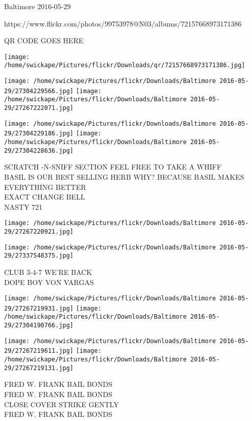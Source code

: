 \documentclass[10pt,letterpaper]{article}
\begin{document}
Baltimore 2016-05-29

https://www.flickr.com/photos/99753978@N03/albums/72157668973171386

QR CODE GOES HERE

\texttt{[image: /home/swickape/Pictures/flickr/Downloads/qr/72157668973171386.jpg]}
\pagebreak

\texttt{[image: /home/swickape/Pictures/flickr/Downloads/Baltimore 2016-05-29/27304229566.jpg]}
\texttt{[image: /home/swickape/Pictures/flickr/Downloads/Baltimore 2016-05-29/27267222071.jpg]}

\texttt{[image: /home/swickape/Pictures/flickr/Downloads/Baltimore 2016-05-29/27304229186.jpg]}
\texttt{[image: /home/swickape/Pictures/flickr/Downloads/Baltimore 2016-05-29/27304228636.jpg]}

SCRATCH {-}N{-}SNIFF SECTION FEEL FREE TO TAKE A WHIFF\\
BASIL IS OUR BEST SELLING HERB WHY?  BECAUSE BASIL MAKES EVERYTHING BETTER\\
EXACT CHANGE BELL\\
NASTY 721\\
\pagebreak

\texttt{[image: /home/swickape/Pictures/flickr/Downloads/Baltimore 2016-05-29/27267220921.jpg]}

\vspace{0.25in}
\texttt{[image: /home/swickape/Pictures/flickr/Downloads/Baltimore 2016-05-29/27337548375.jpg]}

CLUB 3{-}4{-}7 WE'RE BACK\\
DOPE BOY VON VARGAS\\
\pagebreak

\texttt{[image: /home/swickape/Pictures/flickr/Downloads/Baltimore 2016-05-29/27267219931.jpg]}
\texttt{[image: /home/swickape/Pictures/flickr/Downloads/Baltimore 2016-05-29/27304190766.jpg]}

\texttt{[image: /home/swickape/Pictures/flickr/Downloads/Baltimore 2016-05-29/27267219611.jpg]}
\texttt{[image: /home/swickape/Pictures/flickr/Downloads/Baltimore 2016-05-29/27267219131.jpg]}

FRED W. FRANK BAIL BONDS\\
FRED W. FRANK BAIL BONDS\\
CLOSE COVER STRIKE GENTLY\\
FRED W. FRANK BAIL BONDS\\
\pagebreak
\end{document}

